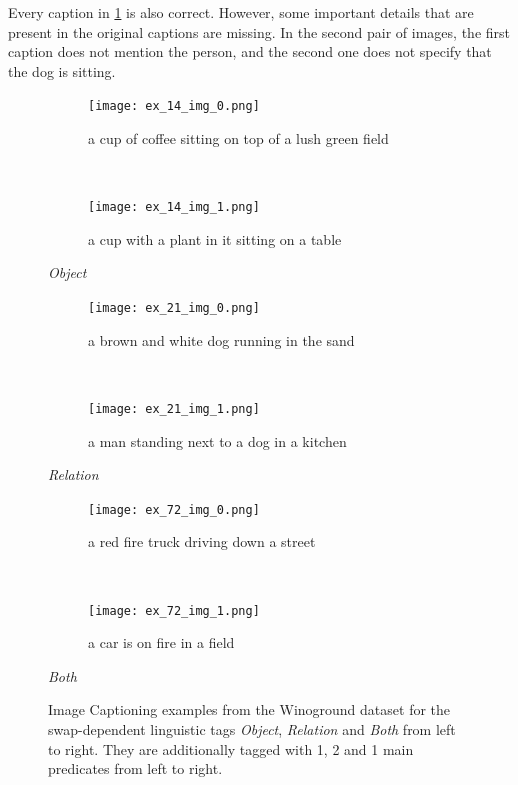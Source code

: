 Every caption in \cref{fig:captioning-examples-linguistic} is also correct. However, some important details that are present in the original captions are missing. In the second pair of images, the first caption does not mention the person, and the second one does not specify that the dog is sitting.

\begin{figure}[ht]
\centering
    \begin{minipage}[t]{.30\textwidth}
        \begin{subfigure}[t]{\textwidth}
        \centering
        \texttt{[image: ex\_14\_img\_0.png]}
        \caption{a cup of coffee sitting on top of a lush green field}
        \end{subfigure}\\
        \begin{subfigure}[t]{\textwidth}
        \centering
        \texttt{[image: ex\_14\_img\_1.png]}
        \caption{a cup with a plant in it sitting on a table}
        \end{subfigure}%
        \caption*{\textit{Object}}
    \end{minipage}
    \hfill
    \begin{minipage}[t]{.30\textwidth}
        \begin{subfigure}[t]{\textwidth}
        \centering
        \texttt{[image: ex\_21\_img\_0.png]}
        \caption{a brown and white dog running in the sand}
        \end{subfigure}\\
        \begin{subfigure}[t]{\textwidth}
        \centering
        \texttt{[image: ex\_21\_img\_1.png]}
        \caption{a man standing next to a dog in a kitchen}
        \end{subfigure}%
        \caption*{\textit{Relation}}
    \end{minipage}
    \hfill
    \begin{minipage}[t]{.30\textwidth}
        \begin{subfigure}[t]{\textwidth}
        \centering
        \texttt{[image: ex\_72\_img\_0.png]}
        \caption{a red fire truck driving down a street}
        \end{subfigure}\\
        \begin{subfigure}[t]{\textwidth}
        \centering
        \texttt{[image: ex\_72\_img\_1.png]}
        \caption{a car is on fire in a field}
        \end{subfigure}%
        \vspace{10pt}
        \caption*{\textit{Both}}
    \end{minipage}%
    \caption{Image Captioning examples from the Winoground dataset for the swap-dependent linguistic tags \textit{Object}, \textit{Relation} and \textit{Both} from left to right. They are additionally tagged with 1, 2 and 1 main predicates from left to right.}
    \label{fig:captioning-examples-linguistic}
\end{figure}


